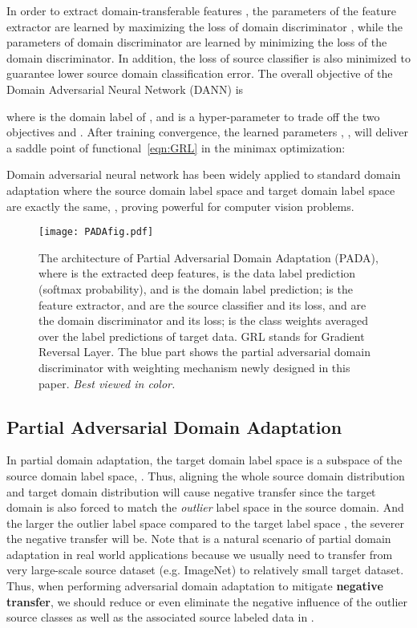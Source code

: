 \documentclass[runningheads]{llncs}
\begin{document}
In order to extract domain-transferable features , the parameters  of the feature extractor  are learned by maximizing the loss of domain discriminator , while the parameters  of domain discriminator  are learned by minimizing the loss of the domain discriminator. In addition, the loss of source classifier  is also minimized to guarantee lower source domain classification error. The overall objective of the Domain Adversarial Neural Network (DANN) \cite{cite:ICML15RevGrad} is

where  is the domain label of , and  is a hyper-parameter to trade off the two objectives  and .
After training convergence, the learned parameters , ,  will deliver a saddle point of functional~\eqref{eqn:GRL} in the minimax optimization: 

Domain adversarial neural network has been widely applied to standard domain adaptation where the source domain label space and target domain label space are exactly the same, , proving powerful for computer vision problems.

\begin{figure}[tbp]
  \centering
  \texttt{[image: PADAfig.pdf]}
  \caption{The architecture of Partial Adversarial Domain Adaptation (PADA), where  is the extracted deep features,  is the data label prediction (softmax probability), and  is the domain label prediction;  is the feature extractor,  and  are the source classifier and its loss,  and  are the domain discriminator and its loss;  is the class weights averaged over the label predictions of target data. GRL stands for Gradient Reversal Layer. The blue part shows the partial adversarial domain discriminator with weighting mechanism newly designed in this paper. \emph{Best viewed in color.}}
   \label{fig:PADA}
\end{figure}

\subsection{Partial Adversarial Domain Adaptation}
In partial domain adaptation, the target domain label space is a subspace of the source domain label space, . Thus, aligning the whole source domain distribution  and target domain distribution  will cause negative transfer since the target domain is also forced to match the \emph{outlier} label space  in the source domain. And the larger the outlier label space  compared to the target label space , the severer the negative transfer will be. Note that  is a natural scenario of partial domain adaptation in real world applications because we usually need to transfer from very large-scale source dataset (e.g. ImageNet) to relatively small target dataset. 
Thus, when performing adversarial domain adaptation to mitigate \textbf{negative transfer}, we should reduce or even eliminate the negative influence of the outlier source classes as well as the associated source labeled data in . 
\end{document}
